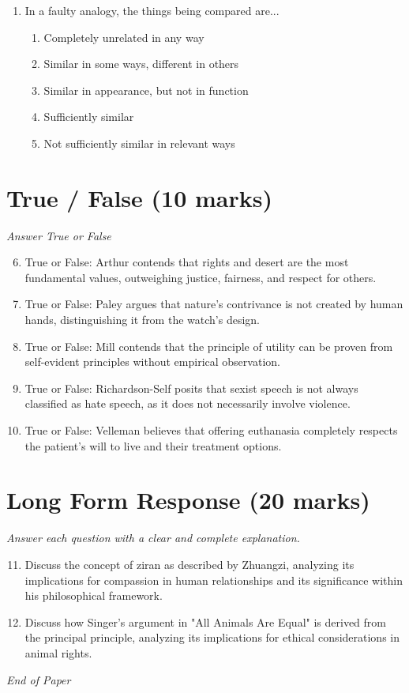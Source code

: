 \documentclass[12pt]{article}
\begin{document}
\begin{enumerate}[label=\arabic*.]
\begin{enumerate}[label=(\alph*)]
    \item China
    \item Silla
    \item Goguryeo
    \item Joseon
\end{enumerate}
\item In a faulty analogy, the things being compared are...
\begin{enumerate}[label=(\alph*)]
    \item Completely unrelated in any way
    \item Similar in some ways, different in others
    \item Similar in appearance, but not in function
    \item Sufficiently similar
    \item Not sufficiently similar in relevant ways
\end{enumerate}
\end{enumerate}

\section*{True / False (10 marks)}
\textit{Answer True or False}
\begin{enumerate}[label=\arabic*.]
\setcounter{enumi}{5}
\item True or False: Arthur contends that rights and desert are the most fundamental values, outweighing justice, fairness, and respect for others.
\item True or False: Paley argues that nature's contrivance is not created by human hands, distinguishing it from the watch's design.
\item True or False: Mill contends that the principle of utility can be proven from self-evident principles without empirical observation.
\item True or False: Richardson-Self posits that sexist speech is not always classified as hate speech, as it does not necessarily involve violence.
\item True or False: Velleman believes that offering euthanasia completely respects the patient's will to live and their treatment options.
\end{enumerate}

\section*{Long Form Response (20 marks)}
\textit{Answer each question with a clear and complete explanation.}
\begin{enumerate}[label=\arabic*.]
\setcounter{enumi}{10}
\item Discuss the concept of ziran as described by Zhuangzi, analyzing its implications for
compassion in human relationships and its significance within his philosophical framework.
\item Discuss how Singer's argument in "All Animals Are Equal" is derived from the principal
principle, analyzing its implications for ethical considerations in animal rights.
\end{enumerate}

\vfill
\noindent\textit{End of Paper}
\end{document}

